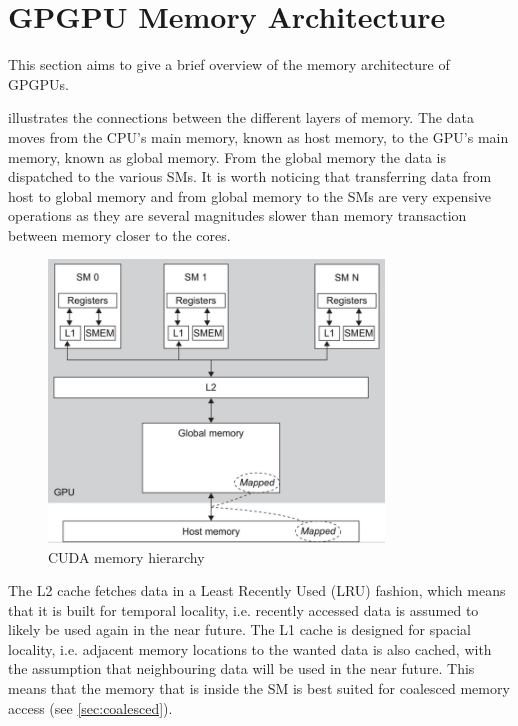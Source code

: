 \section{GPGPU Memory Architecture}
\label{sec:gpgpu memory architecture}

This section aims to give a brief overview of the memory architecture of GPGPUs.

 illustrates the connections between the different layers of memory.
The data moves from the CPU's main memory, known as host memory, to the GPU's main memory, known as global memory.
From the global memory the data is dispatched to the various SMs.
It is worth noticing that transferring data from host to global memory and from global memory to the SMs are very expensive operations as they are several magnitudes slower than memory transaction between memory closer to the cores.

\begin{figure}[htb]
  \centering
  \includegraphics[height=7.5cm]{graphics/images/cuda-mem-hierarchy.png}
  \caption{CUDA memory hierarchy~\cite{farber2011cuda}}
  \label{fig:cpu gpu communication}
\end{figure}

The L2 cache fetches data in a Least Recently Used (LRU) fashion, which means that it is built for temporal locality, i.e. recently accessed data is assumed to likely be used again in the near future.
The L1 cache is designed for spacial locality, i.e. adjacent memory locations to the wanted data is also cached, with the assumption that neighbouring data will be used in the near future.
This means that the memory that is inside the SM is best suited for coalesced memory access (see \cref{sec:coalesced}).


